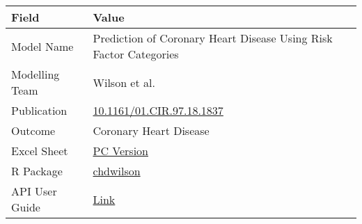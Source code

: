 \documentclass[
]{book}
\begin{document}
\begin{longtable}[]{@{}ll@{}}
\toprule
\begin{minipage}[b]{0.45\columnwidth}\raggedright
Field\strut
\end{minipage} & \begin{minipage}[b]{0.49\columnwidth}\raggedright
Value\strut
\end{minipage}\tabularnewline
\midrule
\endhead
\begin{minipage}[t]{0.45\columnwidth}\raggedright
Model Name\strut
\end{minipage} & \begin{minipage}[t]{0.49\columnwidth}\raggedright
Prediction of Coronary Heart Disease Using Risk Factor Categories\strut
\end{minipage}\tabularnewline
\begin{minipage}[t]{0.45\columnwidth}\raggedright
Modelling Team\strut
\end{minipage} & \begin{minipage}[t]{0.49\columnwidth}\raggedright
Wilson et al.\strut
\end{minipage}\tabularnewline
\begin{minipage}[t]{0.45\columnwidth}\raggedright
Publication\strut
\end{minipage} & \begin{minipage}[t]{0.49\columnwidth}\raggedright
\href{https://doi.org/10.1161/01.CIR.97.18.1837}{10.1161/01.CIR.97.18.1837}\strut
\end{minipage}\tabularnewline
\begin{minipage}[t]{0.45\columnwidth}\raggedright
Outcome\strut
\end{minipage} & \begin{minipage}[t]{0.49\columnwidth}\raggedright
Coronary Heart Disease\strut
\end{minipage}\tabularnewline
\begin{minipage}[t]{0.45\columnwidth}\raggedright
Excel Sheet\strut
\end{minipage} & \begin{minipage}[t]{0.49\columnwidth}\raggedright
\href{https://drive.google.com/uc?export=download\&id=18RcG1yHeobxNw7T7m_dnF_5VDIz1ty--}{PC Version}\strut
\end{minipage}\tabularnewline
\begin{minipage}[t]{0.45\columnwidth}\raggedright
R Package\strut
\end{minipage} & \begin{minipage}[t]{0.49\columnwidth}\raggedright
\href{https://github.com/resplab/chdwilson}{chdwilson}\strut
\end{minipage}\tabularnewline
\begin{minipage}[t]{0.45\columnwidth}\raggedright
API User Guide\strut
\end{minipage} & \begin{minipage}[t]{0.49\columnwidth}\raggedright
\href{https://resplab.github.io/prismguide/api-users-guide.html\#chdwilson-1}{Link}\strut
\end{minipage}\tabularnewline
\bottomrule
\end{longtable}
\end{document}
